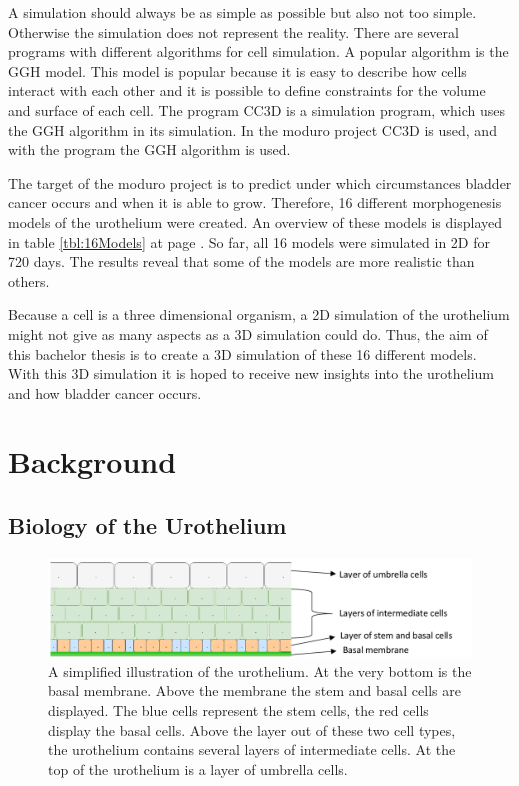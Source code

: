 A simulation should always be as simple as possible but also not too simple. Otherwise the simulation does not represent the reality. 
There are several programs with different algorithms for cell simulation. A popular algorithm is the \ac{GGH} model. This model is popular because it is easy to describe how cells interact with each other and it is possible to define constraints for the volume and surface of each cell. \newline
The program \ac{CC3D} is a simulation program, which uses the \ac{GGH} algorithm in its simulation. In the moduro project \ac{CC3D} is used, and with the program the \ac{GGH} algorithm is used.

The target of the moduro project is to predict under which circumstances bladder cancer occurs and when it is able to grow. Therefore, 16 different morphogenesis models of the urothelium were created. An overview of these models is displayed in table \ref{tbl:16Models} at page \pageref{tbl:16Models}. So far, all 16 models were simulated in 2D for 720 days. The results reveal that some of the models are more realistic than others.

Because a cell is a three dimensional organism, a 2D simulation of the urothelium might not give as many aspects as a 3D simulation could do. Thus, the aim of this bachelor thesis is to create a 3D simulation of these 16 different models. With this 3D simulation it is hoped to receive new insights into the urothelium and how bladder cancer occurs.

\section{Background}
\subsection{Biology of the Urothelium}

\begin{figure}
	\center
	\includegraphics[scale=0.3]{figures/Urothelium.png}
	\caption{A simplified illustration of the urothelium. At the very bottom is the basal membrane. Above the membrane the stem and basal cells are displayed. The blue cells represent the stem cells, the red cells display the basal cells. Above the layer out of these two cell types, the urothelium contains several layers of intermediate cells. At the top of the urothelium is a layer of umbrella cells.}
	\label{img:physiology_urothelium}
\end{figure}


